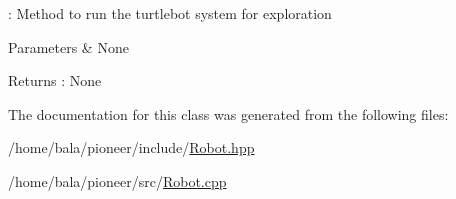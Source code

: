 \+: Method to run the turtlebot system for exploration 


\begin{DoxyParams}{Parameters}
{\em } & None \\
\hline
\end{DoxyParams}
\begin{DoxyReturn}{Returns}
\+: None 
\end{DoxyReturn}


The documentation for this class was generated from the following files\+:\begin{DoxyCompactItemize}
\item 
/home/bala/pioneer/include/\hyperlink{_robot_8hpp}{Robot.\+hpp}\item 
/home/bala/pioneer/src/\hyperlink{_robot_8cpp}{Robot.\+cpp}\end{DoxyCompactItemize}
